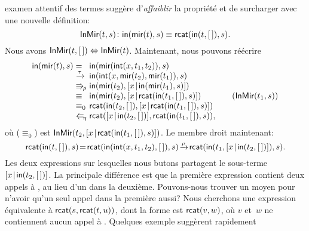 examen attentif des termes suggère d'\emph{affaiblir} la propriété et
de surcharger  avec une nouvelle définition:
\begin{equation*}
\textsf{InMir}({t,s}) \colon \textsf{in}(\textsf{mir}(t),s) \equiv
\textsf{rcat}(\textsf{in}(t,[\,]),s).
\end{equation*}
Nous avons \(\textsf{InMir}({t,[\,]}) \Leftrightarrow
\textsf{InMir}({t})\). Maintenant, nous pouvons réécrire
\begin{equation*}
\begin{array}{@{}r@{\;}l@{\;}l@{\qquad}r@{}}
\fun{in}(\fun{mir}(t),s)
& =
& \fun{in}(\fun{mir}(\fun{int}(x,t_1,t_2)),s)\\
& \xrightarrow{\smash{\tau}}
& \fun{in}(\fun{int}(x,\fun{mir}(t_2),\fun{mir}(t_1)),s)\\
& \Rra{\rho}
& \fun{in}(\fun{mir}(t_2),\cons{x}{\fun{in}(\fun{mir}(t_1),s)})\\
& \equiv
& \fun{in}(\fun{mir}(t_2),\cons{x}{\fun{rcat}(\fun{in}(t_1,\el),s)})
& (\pred{InMir}{t_1,s})\\
& \equiv_0
& \fun{rcat}(\fun{in}(t_2,\el),\cons{x}{\fun{rcat}(\fun{in}(t_1,\el),s)})\\
& \Lla{\eta}
& \fun{rcat}(\cons{x}{\fun{in}(t_2,\el)},
\fun{rcat}(\fun{in}(t_1,\el),s)),
\end{array}
\end{equation*}
où (\(\equiv_0\)) est
\(\textsf{InMir}({t_2,[{x}\!\mid\!{\textsf{rcat}(\textsf{in}(t_1,[\,]),s)}]})\).
Le membre droit maintenant:
\begin{equation*}
\textsf{rcat}(\textsf{in}(t,[\,]),s)
\! = \!
 \textsf{rcat}(\textsf{in}(\textsf{int}(x,t_1,t_2),[\,]),s)
\! \xrightarrow{\smash{\rho}}\!
 \textsf{rcat}(\textsf{in}(t_1,[{x}\!\mid\!{\textsf{in}(t_2,[\,])}]),s).
\end{equation*}
Les deux expressions sur lesquelles nous butons partagent le
sous-terme \([{x}\!\mid\!{\textsf{in}(t_2,[\,])}]\). La
principale différence est que la première expression contient deux
appels à , au lieu d'un dans la
deuxième. Pouvons-nous trouver un moyen pour n'avoir qu'un seul appel
dans la première aussi? Nous cherchons une expression équivalente à
\(\textsf{rcat}(s,\textsf{rcat}(t,u))\), dont la forme est
\(\textsf{rcat}(v,w)\), où \(v\) et~\(w\) ne contiennent aucun appel à
. Quelques exemple suggèrent
rapidement
